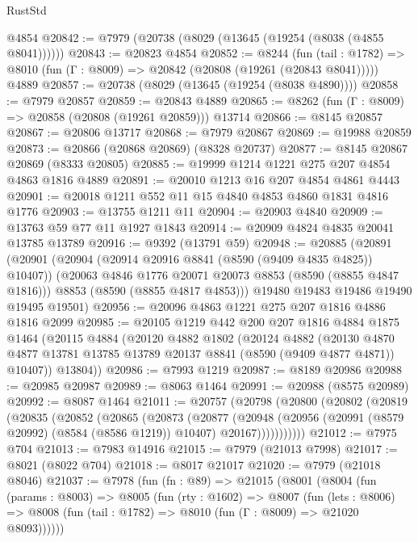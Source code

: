\begin{lexlean}{RustStd}
\begin{coremodule}
    @4854
@20842 := @7979 (@20738 (@8029 (@13645 (@19254 (@8038 (@4855 @8041))))))
@20843 := @20823 @4854
@20852 := @8244
    (fun (tail : @1782) => @8010 (fun (Γ : @8009) => @20842 (@20808 (@19261 (@20843 @8041)))))
    @4889
@20857 := @20738 (@8029 (@13645 (@19254 (@8038 @4890))))
@20858 := @7979 @20857
@20859 := @20843 @4889
@20865 := @8262 (fun (Γ : @8009) => @20858 (@20808 (@19261 @20859))) @13714
@20866 := @8145 @20857
@20867 := @20806 @13717
@20868 := @7979 @20867
@20869 := @19988 @20859
@20873 := @20866 (@20868 @20869) (@8328 @20737)
@20877 := @8145 @20867 @20869 (@8333 @20805)
@20885 := @19999 @1214 @1221 @275 @207 @4854 @4863 @1816 @4889
@20891 := @20010 @1213 @16 @207 @4854 @4861 @4443
@20901 := @20018 @1211 @552 @11 @15 @4840 @4853 @4860 @1831 @4816 @1776
@20903 := @13755 @1211 @11
@20904 := @20903 @4840
@20909 := @13763 @59 @77 @11 @1927 @1843
@20914 := @20909 @4824 @4835 @20041 @13785 @13789
@20916 := @9392 (@13791 @59)
@20948 := @20885
    (@20891
      (@20901
        (@20904 (@20914 @20916 @8841 (@8590 (@9409 @4835 @4825)) @10407))
        (@20063 @4846 @1776 @20071 @20073 @8853 (@8590 (@8855 @4847 @1816)))
        @8853
        (@8590 (@8855 @4817 @4853)))
      @19480
      @19483
      @19486
      @19490
      @19495
      @19501)
@20956 := @20096 @4863 @1221 @275 @207 @1816 @4886 @1816 @2099
@20985 := @20105
    @1219
    @442
    @200
    @207
    @1816
    @4884
    @1875
    @1464
    (@20115
      @4884
      (@20120
        @4882
        @1802
        (@20124
          @4882
          (@20130 @4870 @4877 @13781 @13785 @13789 @20137 @8841 (@8590 (@9409 @4877 @4871)) @10407))
        @13804))
@20986 := @7993 @1219
@20987 := @8189 @20986
@20988 := @20985 @20987
@20989 := @8063 @1464
@20991 := @20988 (@8575 @20989)
@20992 := @8087 @1464
@21011 := @20757
    (@20798
      (@20800
        (@20802
          (@20819
            (@20835
              (@20852
                (@20865
                  (@20873
                    (@20877
                      (@20948
                        (@20956
                          (@20991 (@8579 @20992) (@8584 (@8586 @1219)) @10407)
                          @20167)))))))))))
@21012 := @7975 @704
@21013 := @7983 @14916
@21015 := @7979 (@21013 @7998)
@21017 := @8021 (@8022 @704)
@21018 := @8017 @21017
@21020 := @7979 (@21018 @8046)
@21037 := @7978
    (fun (fn : @89) =>
    @21015
      (@8001
        (@8004
          (fun (params : @8003) =>
          @8005
            (fun (rty : @1602) =>
            @8007
              (fun (lets : @8006) =>
              @8008 (fun (tail : @1782) => @8010 (fun (Γ : @8009) => @21020 @8093))))))

\end{coremodule}
\end{lexlean}
